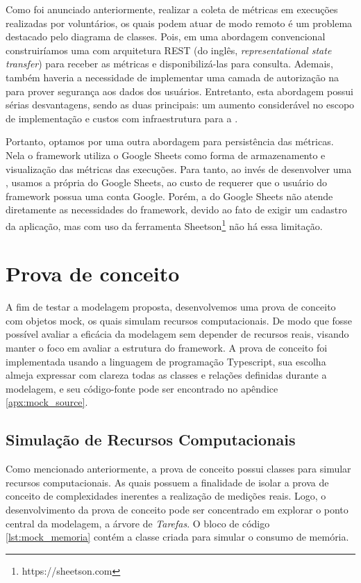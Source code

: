 \documentclass[12pt]{tcc}
\begin{document}
Como foi anunciado anteriormente, realizar a coleta de métricas em execuções realizadas por voluntários, os quais podem atuar de modo remoto é um problema destacado pelo diagrama de classes.
Pois, em uma abordagem convencional construiríamos uma  com arquitetura REST (do inglês, \emph{representational state transfer}) para receber as métricas e disponibilizá-las para consulta.
Ademais, também haveria a necessidade de implementar uma camada de autorização na  para prover segurança aos dados dos usuários.
Entretanto, esta abordagem possui sérias desvantagens, sendo as duas principais: um aumento considerável no escopo de implementação e custos com infraestrutura para a .

Portanto, optamos por uma outra abordagem para persistência das métricas.
Nela o framework utiliza o Google Sheets como forma de armazenamento e visualização das métricas das execuções.
Para tanto, ao invés de desenvolver uma , usamos a própria  do Google Sheets, ao custo de requerer que o usuário do framework possua uma conta Google.
Porém, a  do Google Sheets não atende diretamente as necessidades do framework, devido ao fato de exigir um cadastro da aplicação, mas com uso da ferramenta Sheetson\footnote{https://sheetson.com} não há essa limitação.


\chapter{Prova de conceito}
\label{cap:prova_de_conceito}
A fim de testar a modelagem proposta, desenvolvemos uma prova de conceito com objetos mock, os quais simulam recursos computacionais.
De modo que fosse possível avaliar a eficácia da modelagem sem depender de recursos reais, visando manter o foco em avaliar a estrutura do framework.
A prova de conceito foi implementada usando a linguagem de programação Typescript, sua escolha almeja expressar com clareza todas as classes e relações definidas durante a modelagem, e seu código-fonte pode ser encontrado no apêndice \ref{apx:mock_source}.


\section{Simulação de Recursos Computacionais}
Como mencionado anteriormente, a prova de conceito possui classes para simular recursos computacionais.
As quais possuem a finalidade de isolar a prova de conceito de complexidades inerentes a realização de medições reais.
Logo, o desenvolvimento da prova de conceito pode ser concentrado em explorar o ponto central da modelagem, a árvore de \emph{Tarefas}.
O bloco de código \ref{lst:mock_memoria} contém a classe criada para simular o consumo de memória.
\end{document}
